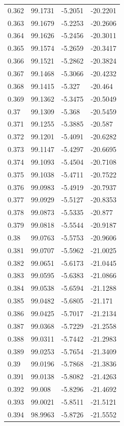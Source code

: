 \begin{tabular}{llll}
0.362 & 99.1731 & -5.2051 & -20.2201 \\
0.363 & 99.1679 & -5.2253 & -20.2606 \\
0.364 & 99.1626 & -5.2456 & -20.3011 \\
0.365 & 99.1574 & -5.2659 & -20.3417 \\
0.366 & 99.1521 & -5.2862 & -20.3824 \\
0.367 & 99.1468 & -5.3066 & -20.4232 \\
0.368 & 99.1415 & -5.327 & -20.464 \\
0.369 & 99.1362 & -5.3475 & -20.5049 \\
0.37 & 99.1309 & -5.368 & -20.5459 \\
0.371 & 99.1255 & -5.3885 & -20.587 \\
0.372 & 99.1201 & -5.4091 & -20.6282 \\
0.373 & 99.1147 & -5.4297 & -20.6695 \\
0.374 & 99.1093 & -5.4504 & -20.7108 \\
0.375 & 99.1038 & -5.4711 & -20.7522 \\
0.376 & 99.0983 & -5.4919 & -20.7937 \\
0.377 & 99.0929 & -5.5127 & -20.8353 \\
0.378 & 99.0873 & -5.5335 & -20.877 \\
0.379 & 99.0818 & -5.5544 & -20.9187 \\
0.38 & 99.0763 & -5.5753 & -20.9606 \\
0.381 & 99.0707 & -5.5962 & -21.0025 \\
0.382 & 99.0651 & -5.6173 & -21.0445 \\
0.383 & 99.0595 & -5.6383 & -21.0866 \\
0.384 & 99.0538 & -5.6594 & -21.1288 \\
0.385 & 99.0482 & -5.6805 & -21.171 \\
0.386 & 99.0425 & -5.7017 & -21.2134 \\
0.387 & 99.0368 & -5.7229 & -21.2558 \\
0.388 & 99.0311 & -5.7442 & -21.2983 \\
0.389 & 99.0253 & -5.7654 & -21.3409 \\
0.39 & 99.0196 & -5.7868 & -21.3836 \\
0.391 & 99.0138 & -5.8082 & -21.4263 \\
0.392 & 99.008 & -5.8296 & -21.4692 \\
0.393 & 99.0021 & -5.8511 & -21.5121 \\
0.394 & 98.9963 & -5.8726 & -21.5552 \\

\end{tabular}
